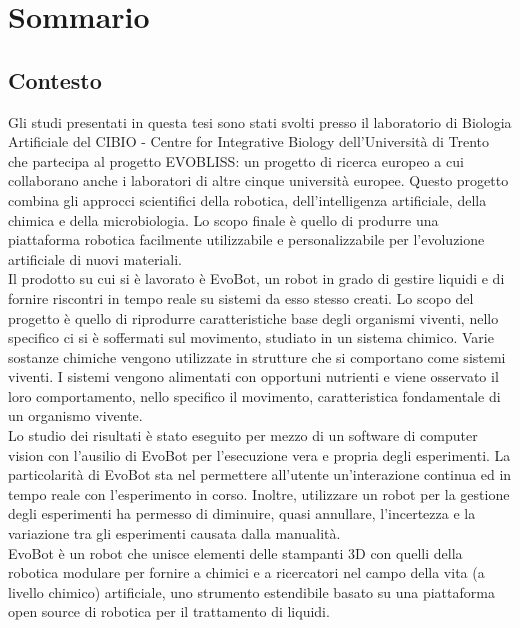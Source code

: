 \chapter*{Sommario} %
\label{sommario}
\section{Contesto}
Gli studi presentati in questa tesi sono stati svolti presso il laboratorio di Biologia Artificiale del CIBIO - Centre for Integrative Biology dell'Università di Trento che partecipa al progetto EVOBLISS: un progetto di ricerca europeo a cui collaborano anche i laboratori di altre cinque università europee. Questo progetto combina gli approcci scientifici della robotica, dell'intelligenza artificiale, della chimica e della microbiologia. Lo scopo finale è quello di produrre una piattaforma robotica facilmente utilizzabile e personalizzabile per l'evoluzione artificiale di nuovi materiali. 
\\Il prodotto su cui si è lavorato è EvoBot, un robot in grado di gestire liquidi e di fornire riscontri in tempo reale su sistemi da esso stesso creati. Lo scopo del progetto è quello di riprodurre caratteristiche base degli organismi viventi, nello specifico ci si è soffermati sul movimento, studiato in un sistema chimico. Varie sostanze chimiche vengono utilizzate in strutture che si comportano come sistemi viventi. I sistemi vengono alimentati con opportuni nutrienti e viene osservato il loro comportamento, nello specifico il movimento, caratteristica fondamentale di un organismo vivente. 
\\Lo studio dei risultati è stato eseguito per mezzo di un software di computer vision con l'ausilio di EvoBot per l’esecuzione vera e propria degli esperimenti. La particolarità di EvoBot sta nel permettere all'utente un'interazione continua ed in tempo reale con l'esperimento in corso.\cite{introd-robot} Inoltre, utilizzare un robot per la gestione degli esperimenti ha permesso di diminuire, quasi annullare, l'incertezza e la variazione tra gli esperimenti causata dalla manualità. 
\\EvoBot è un robot che unisce elementi delle stampanti 3D con quelli della robotica modulare per fornire a chimici e a ricercatori nel campo della vita (a livello chimico) artificiale, uno strumento estendibile basato su una piattaforma open source di robotica per il trattamento di liquidi.
